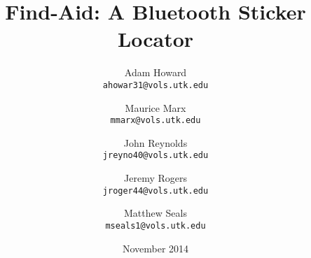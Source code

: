 \documentclass[12pt]{article}
\begin{document}
	\title{Find-Aid: A Bluetooth Sticker Locator}
	\author{Adam Howard \\
		\texttt{ahowar31@vols.utk.edu}
		\and
		Maurice Marx \\
		\texttt{mmarx@vols.utk.edu}
		\and
		John Reynolds \\
		\texttt{jreyno40@vols.utk.edu}
		\and
		Jeremy Rogers \\
		\texttt{jroger44@vols.utk.edu}
		\and
		Matthew Seals \\
		\texttt{mseals1@vols.utk.edu}
		}
	\date{November 2014}
	
	\maketitle
	\pagebreak
	
	\renewcommand{\abstractname}{Executive Summary}
	
	\doublespacing
	
\end{document}
